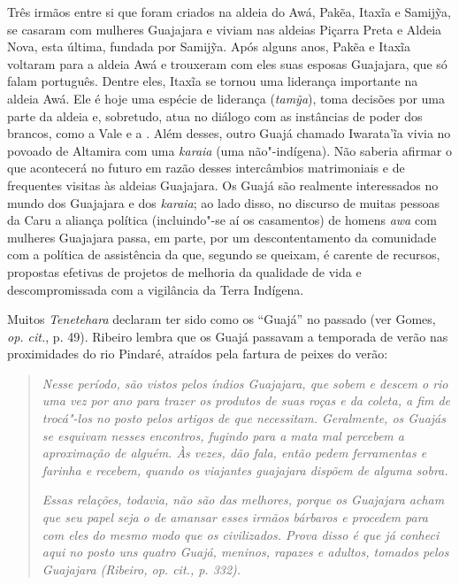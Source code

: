Três irmãos entre si que foram criados na aldeia do Awá, Pakẽa, Itaxĩa e
Samijỹa, se casaram com mulheres Guajajara e viviam nas aldeias Piçarra
Preta e Aldeia Nova, esta última, fundada por Samijỹa. Após alguns anos,
Pakẽa e Itaxĩa voltaram para a aldeia Awá e trouxeram com eles suas
esposas Guajajara, que só falam português. Dentre eles, Itaxĩa se tornou
uma liderança importante na aldeia Awá. Ele é hoje uma espécie de
liderança (\emph{tamỹa}), toma decisões por uma parte da aldeia e,
sobretudo, atua no diálogo com as instâncias de poder dos brancos, como
a Vale e a . Além desses, outro Guajá chamado Iwarata'ĩa vivia no
povoado de Altamira com uma \emph{karaia} (uma não"-indígena). Não
saberia afirmar o que acontecerá no futuro em razão desses intercâmbios
matrimoniais e de frequentes visitas às aldeias Guajajara. Os Guajá são
realmente interessados no mundo dos Guajajara e dos \emph{karaia}; ao
lado disso, no discurso de muitas pessoas da  Caru a aliança política
(incluindo"-se aí os casamentos) de homens \emph{awa} com mulheres
Guajajara passa, em parte, por um descontentamento da comunidade com a
política de assistência da  que, segundo se queixam, é carente de
recursos, propostas efetivas de projetos de melhoria da qualidade de
vida e descompromissada com a vigilância da Terra Indígena.

Muitos \emph{Tenetehara} declaram ter sido como os ``Guajá'' no passado
(ver Gomes, \emph{op. cit.}, p. 49). Ribeiro lembra que os Guajá passavam a
temporada de verão nas proximidades do rio Pindaré, atraídos pela
fartura de peixes do verão:

\begin{quote}
\emph{Nesse período, são vistos pelos índios Guajajara, que sobem e descem o
rio uma vez por ano para trazer os produtos de suas roças e da coleta, a
fim de trocá"-los no posto pelos artigos de que necessitam. Geralmente,
os Guajás se esquivam nesses encontros, fugindo para a mata mal percebem
a aproximação de alguém. Às vezes, dão fala, então pedem ferramentas e
farinha e recebem, quando os viajantes guajajara dispõem de alguma
sobra.}

\noindent\emph{Essas relações, todavia, não são das melhores, porque os Guajajara acham
que seu papel seja o de amansar esses irmãos bárbaros e procedem para
com eles do mesmo modo que os civilizados. Prova disso é que já conheci
aqui no posto uns quatro Guajá, meninos, rapazes e adultos, tomados
pelos Guajajara (Ribeiro, \emph{op. cit.}, p. 332).}
\end{quote}

